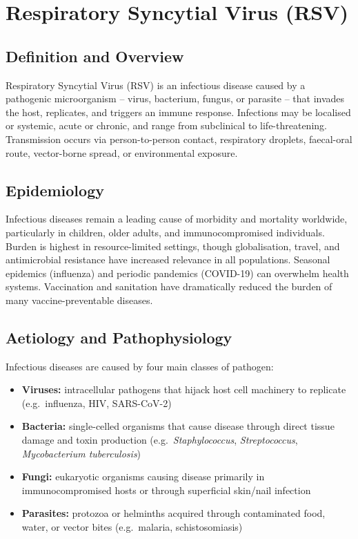 \chapter{Respiratory Syncytial Virus (RSV)}

\section*{Definition and Overview}
Respiratory Syncytial Virus (RSV) is an infectious disease caused by a pathogenic microorganism -- virus, bacterium, fungus, or parasite -- that invades the host, replicates, and triggers an immune response. Infections may be localised or systemic, acute or chronic, and range from subclinical to life-threatening. Transmission occurs via person-to-person contact, respiratory droplets, faecal-oral route, vector-borne spread, or environmental exposure.

\section*{Epidemiology}
Infectious diseases remain a leading cause of morbidity and mortality worldwide, particularly in children, older adults, and immunocompromised individuals. Burden is highest in resource-limited settings, though globalisation, travel, and antimicrobial resistance have increased relevance in all populations. Seasonal epidemics (influenza) and periodic pandemics (COVID-19) can overwhelm health systems. Vaccination and sanitation have dramatically reduced the burden of many vaccine-preventable diseases.

\section*{Aetiology and Pathophysiology}
Infectious diseases are caused by four main classes of pathogen:

\begin{itemize}
    \item \textbf{Viruses:} intracellular pathogens that hijack host cell machinery to replicate (e.g.\ influenza, HIV, SARS-CoV-2)
    \item \textbf{Bacteria:} single-celled organisms that cause disease through direct tissue damage and toxin production (e.g.\ \textit{Staphylococcus}, \textit{Streptococcus}, \textit{Mycobacterium tuberculosis})
    \item \textbf{Fungi:} eukaryotic organisms causing disease primarily in immunocompromised hosts or through superficial skin/nail infection
    \item \textbf{Parasites:} protozoa or helminths acquired through contaminated food, water, or vector bites (e.g.\ malaria, schistosomiasis)
\end{itemize}

